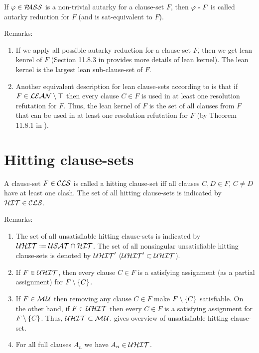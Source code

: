 \documentclass{report}
\begin{document}
\begin{defi}\label{def:autarky-redc}
If $\varphi \in \mathcal{P\hspace{-0.32em}ASS}$ is a non-trivial autarky for a clause-set $F$, then $\varphi *F$ is called autarky reduction for $F$ (and is sat-equivalent to $F$).
\end{defi} 
Remarks:
  \begin{enumerate}
  \item If we apply all possible autarky reduction for a clause-set $F$, then we get lean kenrel of $F$ (Section 11.8.3 in \cite{h25} provides more details of lean kernel). The lean kernel is the largest lean sub-clause-set of $F$.
  \item Another equivalent description for lean clause-sets according to \cite{h28} is that if $F \in \mathcal{LEAN} \setminus \top$ then every clause $C \in F$ is used in at least one resolution refutation for $F$. Thus, the lean kernel of $F$ is the set of all clauses from $F$ that can be used in at least one resolution refutation for $F$ (by Theorem 11.8.1 in \cite{h25}).
  \end{enumerate}
\section{Hitting clause-sets}
\label{sec:hit}

\begin{defi}\label{def:hit-cls}
A clause-set $F \in \mathcal{CLS} $ is called a hitting clause-set iff all clauses $C,D \in F$, $C \not = D$ have at least one clash. The set of all hitting clause-sets is indicated by $\mathcal{HIT} \in \mathcal{CLS}$.
\end{defi}
Remarks:
  \begin{enumerate}
  \item The set of all unsatisfiable hitting clause-sets is indicated by $\mathcal{U}\mathcal{HIT} := \mathcal{USAT} \cap \mathcal{HIT}$. The set of all nonsingular unsatisfiable hitting clause-sets is denoted by $\mathcal{U}\mathcal{HIT}'$ ($\mathcal{U}\mathcal{HIT}' \subset \mathcal{U}\mathcal{HIT}$).
  \item If $F \in \mathcal{U}\mathcal{HIT}$, then every clause $C \in F$ is a satisfying assignment (as a partial assignment) for $F \setminus \{ C \}$.
  \item If $F \in \mathcal{M\hspace{0.8pt}U}$ then removing any clause $C \in F$ make $F \setminus \{ C \}$ satisfiable. On the other hand, if $F \in \mathcal{U}\mathcal{HIT}$ then every $C \in F$ is a satisfying assignment for $F \setminus \{ C \}$. Thus, $\mathcal{U}\mathcal{HIT} \subset \mathcal{M\hspace{0.8pt}U}$. \cite{h26} gives overview of unsatisfiable hitting clause-set.
  \item For all full clauses $A_n$ we have $A_n \in \mathcal{U}\mathcal{HIT}$.
  \end{enumerate}
\end{document}
